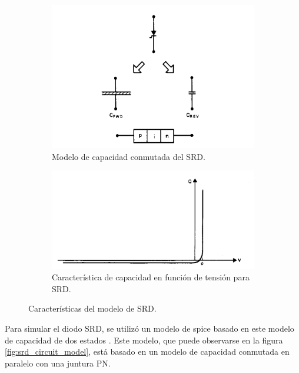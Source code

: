 \begin{figure}
    \centering
    \begin{subfigure}[b]{0.45\textwidth}
        \includegraphics[width=\textwidth]{images/srd_switched_model.jpg}
        \caption{Modelo de capacidad conmutada del SRD.}
        \label{fig:srd_switched_model}
    \end{subfigure}
    \hfill
    \begin{subfigure}[b]{0.45\textwidth}
        \includegraphics[width=\textwidth]{images/srd_capacity_vs_voltaje.jpg}
        \caption{Característica de capacidad en función de tensión para SRD.}
        \label{fig:srd_capacity_vs_voltaje}
    \end{subfigure}
    \caption{Características del modelo de SRD.}
    \label{fig:srd_model_characteristics}
\end{figure}

Para simular el diodo SRD, se utilizó un modelo de spice basado en este modelo
de capacidad de dos estados \cite{zhang1995} \cite{zhang1996}. Este modelo, que
puede observarse en la figura \ref{fig:srd_circuit_model}, está basado en un
modelo de capacidad conmutada en paralelo con una juntura PN.

